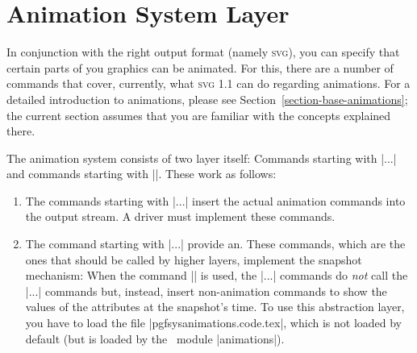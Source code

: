 %
%
%


\section[pgfsys-animations]{Animation System Layer}
\label{section-pgfsys-anim}

\begin{codeexample}
\makeatletter

\def\animationexample#1#2#3{%
  \tikz[fill=blue!25, draw=blue, ultra thick] {
    \pgfidrefnextuse{\objid}{#1}
    \pgfsysanimkeywhom{\objid}{#2}
    \pgfidrefnextuse{\nodeid}{node}
    \pgfsysanimkeyevent{\nodeid}{}{click}{}{begin}
    #3
    \node [font=\footnotesize, circle, fill, draw, align=center]
      (node) {Click \\ here};
  }%
}
\end{codeexample}

In conjunction with the right output format (namely \textsc{svg}), you can
specify that certain parts of you graphics can be animated. For this, there are
a number of commands that cover, currently, what \textsc{svg 1.1} can do
regarding animations. For a detailed introduction to animations, please see
Section~\ref{section-base-animations}; the current section assumes that you are
familiar with the concepts explained there.

The animation system consists of two layer itself: Commands starting with
|\pgfsys@anim...| and commands starting with |\pgfsysanim|. These work as
follows:
%
\begin{enumerate}
    \item The commands starting with |\pgfsys@anim...| insert the actual
        animation commands into the output stream. A driver must implement
        these commands.
    \item The command starting with |\pgfsysanim...| provide an. These
        commands, which are the ones that should be called by higher layers,
        implement the snapshot mechanism: When the command
        |\pgfsysanimsnapshot| is used, the |\pgfsysanim...| commands do
        \emph{not} call the |\pgfsys@anim...| commands but, instead, insert
        non-animation commands to show the values of the attributes at the
        snapshot's time. To use this abstraction layer, you have to load the
        file |pgfsysanimations.code.tex|, which is not loaded by default (but
        is loaded by the \pgfname\ module |animations|).
\end{enumerate}


